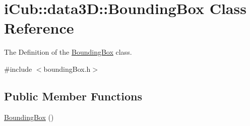 \section{i\+Cub\+:\+:data3\+D\+:\+:Bounding\+Box Class Reference}
\label{classiCub_1_1data3D_1_1BoundingBox}


The Definition of the \hyperlink{classiCub_1_1data3D_1_1BoundingBox}{Bounding\+Box} class.  




{\ttfamily \#include $<$bounding\+Box.\+h$>$}

\subsection*{Public Member Functions}
\begin{DoxyCompactItemize}
\item 
\hyperlink{classiCub_1_1data3D_1_1BoundingBox_aed6d593bf4359e014acb416663e66903}{Bounding\+Box} ()\label{classiCub_1_1data3D_1_1BoundingBox_aed6d593bf4359e014acb416663e66903}


\end{DoxyCompactItemize}
